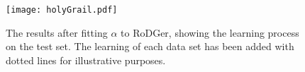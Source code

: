 \begin{figure}[H]
  \begin{center}
    \texttt{[image: holyGrail.pdf]}
    \caption[RoDGer Test Results]{The results after fitting $\alpha{}$ to RoDGer, showing the learning process on the test set. The learning of each data set has been added with dotted lines for illustrative purposes.}
    \label{fig:holyTrinity}
  \end{center}
\end{figure}


